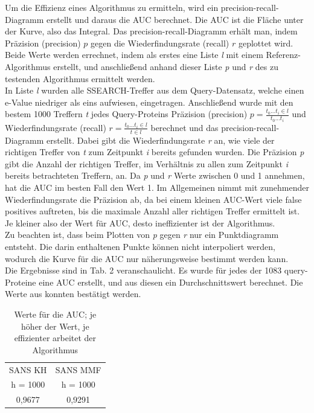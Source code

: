 \documentclass{article}
\begin{document}
Um die Effizienz eines Algorithmus zu ermitteln, wird ein precision-recall-Diagramm erstellt und daraus die AUC berechnet. Die AUC ist die Fläche unter der Kurve, also das Integral. Das precision-recall-Diagramm erhält man, indem Präzision (precision) $p$ gegen die Wiederfindungsrate (recall) $r$ geplottet wird. Beide Werte werden errechnet, indem als erstes eine Liste \textit l mit einem Referenz-Algorithmus erstellt, und anschließend anhand dieser Liste \textit p und \textit r des zu testenden Algorithmus ermittelt werden.\\In Liste \textit l wurden alle SSEARCH-Treffer aus dem Query-Datensatz, welche einen e-Value niedriger als eins aufwiesen, eingetragen. Anschließend wurde mit den bestem 1000 Treffern \textit t jedes Query-Proteins Präzision (precision) $p = \frac{t_0 ... t_i \in l}{t_0 ... t_i}$ und Wiederfindungsrate (recall) $r = \frac {t_0 ... t_i \in l}{t \in l}$ berechnet und das precision-recall-Diagramm erstellt. Dabei gibt die Wiederfindungsrate \textit r an, wie viele der richtigen Treffer von \textit t zum Zeitpunkt \textit i bereits gefunden wurden. Die Präzision \textit p gibt die Anzahl der richtigen Treffer, im Verhältnis zu allen zum Zeitpunkt \textit i bereits betrachteten Treffern, an. Da \textit p und \textit r Werte zwischen 0 und 1 annehmen, hat die AUC im besten Fall den Wert 1. Im Allgemeinen nimmt mit zunehmender Wiederfindungsrate die Präzision ab, da bei einem kleinen AUC-Wert viele false positives auftreten, bis die maximale Anzahl aller richtigen Treffer ermittelt ist. Je kleiner also der Wert für AUC, desto ineffizienter ist der Algorithmus.\\Zu beachten ist, dass beim Plotten von \textit p gegen \textit r nur ein Punktdiagramm entsteht. Die darin enthaltenen Punkte können nicht interpoliert werden, wodurch die Kurve für die AUC nur näherungsweise bestimmt werden kann.\\Die Ergebnisse sind in Tab. 2 veranschaulicht. Es wurde für jedes der 1083 query-Proteine eine AUC erstellt, und aus diesen ein Durchschnittswert berechnet. Die Werte aus \cite{Holm} konnten bestätigt werden.


  \begin{table}[h]
    \centering
    \caption{Werte für die AUC; je höher der Wert, je effizienter arbeitet der Algorithmus}
    \begin{tabular}{cc}
      \hline
      SANS KH & SANS MMF\\
      h = 1000 & h = 1000 \\
      \hline
      0,9677 & 0,9291 \\
      \hline
    \end{tabular}
  \end{table}
\end{document}

